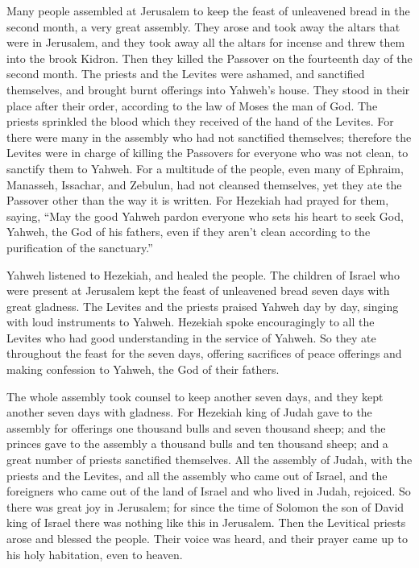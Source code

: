 Many people assembled at Jerusalem to keep the feast of
unleavened bread in the second month, a very great assembly.
 They arose and took away the altars that were in
Jerusalem, and they took away all the altars for incense and threw them
into the brook Kidron.  Then they killed the Passover on
the fourteenth day of the second month. The priests and the Levites were
ashamed, and sanctified themselves, and brought burnt offerings into
Yahweh's house.  They stood in their place after their
order, according to the law of Moses the man of God. The priests
sprinkled the blood which they received of the hand of the Levites.
 For there were many in the assembly who had not sanctified
themselves; therefore the Levites were in charge of killing the
Passovers for everyone who was not clean, to sanctify them to Yahweh.
 For a multitude of the people, even many of Ephraim,
Manasseh, Issachar, and Zebulun, had not cleansed themselves, yet they
ate the Passover other than the way it is written. For Hezekiah had
prayed for them, saying, ``May the good Yahweh pardon everyone
 who sets his heart to seek God, Yahweh, the God of his
fathers, even if they aren't clean according to the purification of the
sanctuary.''

 Yahweh listened to Hezekiah, and healed the people.
 The children of Israel who were present at Jerusalem kept
the feast of unleavened bread seven days with great gladness. The
Levites and the priests praised Yahweh day by day, singing with loud
instruments to Yahweh.  Hezekiah spoke encouragingly to all
the Levites who had good understanding in the service of Yahweh. So they
ate throughout the feast for the seven days, offering sacrifices of
peace offerings and making confession to Yahweh, the God of their
fathers.

 The whole assembly took counsel to keep another seven
days, and they kept another seven days with gladness.  For
Hezekiah king of Judah gave to the assembly for offerings one thousand
bulls and seven thousand sheep; and the princes gave to the assembly a
thousand bulls and ten thousand sheep; and a great number of priests
sanctified themselves.  All the assembly of Judah, with the
priests and the Levites, and all the assembly who came out of Israel,
and the foreigners who came out of the land of Israel and who lived in
Judah, rejoiced.  So there was great joy in Jerusalem; for
since the time of Solomon the son of David king of Israel there was
nothing like this in Jerusalem.  Then the Levitical priests
arose and blessed the people. Their voice was heard, and their prayer
came up to his holy habitation, even to heaven.

